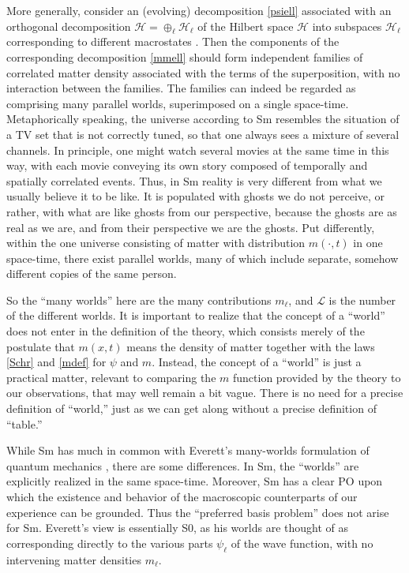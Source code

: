 \documentclass[12pt]{article}
\newcommand{\Hilbert}{\mathscr{H}}
\newcommand{\Lnum}{\mathscr{L}}
\newcommand{\z}[1]{{#1}}
\begin{document}
\z{More generally, consider an (evolving) decomposition \eqref{psiell} associated with an orthogonal decomposition  $\Hilbert=\oplus_\ell \Hilbert_\ell$ of the Hilbert space $\Hilbert$ into subspaces $\Hilbert_\ell$ corresponding to different macrostates  \cite{vN}. Then the components of the corresponding decomposition \eqref{mmell} should}
form independent families of correlated matter density associated with the terms of the superposition, with no interaction between the families. The families can indeed be regarded as comprising many parallel worlds, superimposed on a single space-time.  Metaphorically speaking, the universe according to Sm resembles the situation of a TV set that is not correctly tuned, so that one always sees a mixture of several channels. In principle, one might watch several movies at the same time in this way, with each movie conveying its own story composed of temporally and spatially correlated events. Thus, in Sm reality is very different from what we usually believe it  to be like. It is populated with ghosts we do not perceive, or rather, with what are like ghosts from our perspective, because the ghosts are as real as we are, and from their perspective we are the ghosts. Put differently, within the one universe consisting of matter with distribution $m(\cdot,t)$ in one space-time, there exist parallel worlds, many of which include separate, somehow different copies of the same person.

So the ``many worlds'' here are the many contributions $m_\ell$, and $\Lnum$ is the number of the different worlds. It is important to realize that the concept of a ``world'' does not enter in the definition of the theory, which consists merely of the postulate that $m(x,t)$ means the density of matter together with the laws \eqref{Schr} and \eqref{mdef} for $\psi$ and $m$. Instead, the concept of a ``world'' is just a practical matter, relevant to comparing the $m$ function provided by the theory to our observations, that may well remain a bit vague. There is no need for a precise definition of ``world,'' just as we can get along without a precise definition of ``table.''

While Sm has much in common with Everett's many-worlds formulation of quantum mechanics \cite{Eve57}, there are some differences. In Sm, the ``worlds'' are explicitly realized in the same space-time. Moreover, Sm has a clear PO upon which the existence and behavior of the macroscopic counterparts of our experience can be grounded. \z{Thus the ``preferred basis problem'' does not arise for Sm.} \z{Everett}'s view is essentially S0, as his worlds are thought of as corresponding directly to the various parts $\psi_\ell$ of the wave function, with no intervening matter densities $m_\ell$.
\end{document}

